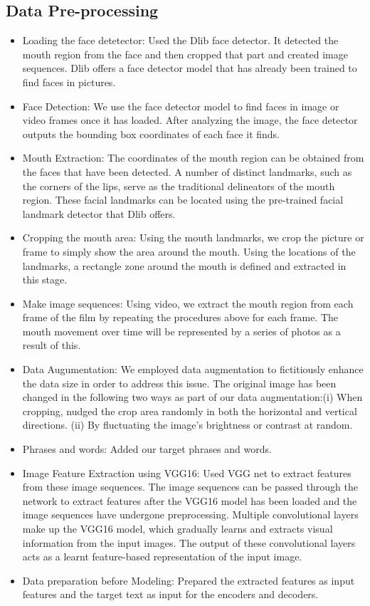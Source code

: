\documentclass[conference]{IEEEtran}
\begin{document}
\subsection{Data Pre-processing}
\begin{itemize}
\item Loading the face detetector: Used the Dlib face detector. It detected the mouth region from the face and then cropped that part and created image sequences. Dlib offers a face detector model that has already been trained to find faces in pictures. 
\item Face Detection: We use the face detector model to find faces in image or video frames once it has loaded. After analyzing the image, the face detector outputs the bounding box coordinates of each face it finds.
\item Mouth Extraction: The coordinates of the mouth region can be obtained from the faces that have been detected. A number of distinct landmarks, such as the corners of the lips, serve as the traditional delineators of the mouth region. These facial landmarks can be located using the pre-trained facial landmark detector that Dlib offers.
\item Cropping the mouth area: Using the mouth landmarks, we crop the picture or frame to simply show the area around the mouth. Using the locations of the landmarks, a rectangle zone around the mouth is defined and extracted in this stage.
\item Make image sequences: Using video, we extract the mouth region from each frame of the film by repeating the procedures above for each frame. The mouth movement over time will be represented by a series of photos as a result of this.
\item Data Augumentation: We employed data augmentation to fictitiously enhance the data size in order to address this issue. The original image has been changed in the following two ways as part of our data augmentation:(i) When cropping, nudged the crop area randomly in both the horizontal and vertical directions. (ii) By fluctuating the image's brightness or contrast at random.
\item Phrases and words: Added our target phrases and words.
\item Image Feature Extraction using VGG16: Used VGG net to extract features from these image sequences. The image sequences can be passed through the network to extract features after the VGG16 model has been loaded and the image sequences have undergone preprocessing. Multiple convolutional layers make up the VGG16 model, which gradually learns and extracts visual information from the input images. The output of these convolutional layers acts as a learnt feature-based representation of the input image.
\item Data preparation before Modeling: Prepared the extracted features as input features and the target text as input for the encoders and decoders.
\end{itemize}
\end{document}
